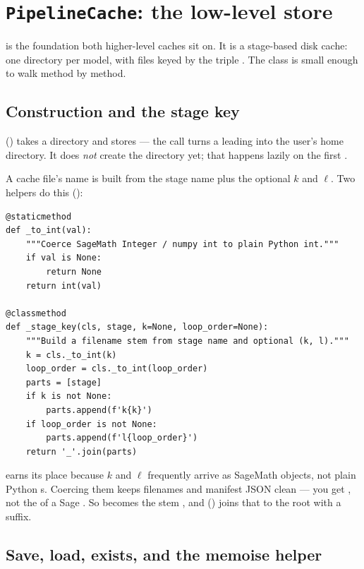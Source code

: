 \section{\texttt{PipelineCache}: the low-level store}

 is the foundation both higher-level caches sit on.
It is a stage-based disk cache: one directory per model, with files keyed by
the triple . The class is small enough to
walk method by method.

\subsection{Construction and the stage key}

 () takes a 
directory and stores  --- the
 call turns a leading \code{\~{}} into the user's home
directory. It does \emph{not} create the directory yet; that happens lazily on
the first .

A cache file's name is built from the stage name plus the optional $k$ and
$\ell$. Two helpers do this ():

\begin{lstlisting}
@staticmethod
def _to_int(val):
    """Coerce SageMath Integer / numpy int to plain Python int."""
    if val is None:
        return None
    return int(val)

@classmethod
def _stage_key(cls, stage, k=None, loop_order=None):
    """Build a filename stem from stage name and optional (k, l)."""
    k = cls._to_int(k)
    loop_order = cls._to_int(loop_order)
    parts = [stage]
    if k is not None:
        parts.append(f'k{k}')
    if loop_order is not None:
        parts.append(f'l{loop_order}')
    return '_'.join(parts)
\end{lstlisting}

 earns its place because $k$ and $\ell$ frequently arrive as
SageMath  objects, not plain Python s. Coercing them
keeps filenames and manifest JSON clean --- you get , not the
 of a Sage . So  becomes
the stem , and 
() joins that to the root with a  suffix.

\subsection{Save, load, exists, and the memoise helper}

